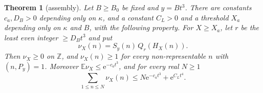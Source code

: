 \documentclass[10pt,reqno]{amsart}
\newtheorem{theorem}{Theorem}[section]
\theoremstyle{remark}
\newcommand{\E}{\mathbb E}
\newcommand{\e}{\mathrm e}
\begin{document}
\begin{theorem}[assembly]\label{thm:assembly}
Let $B\geq B_0$ be fixed and $y=Bt^3$.  There are constants $c_a,D_B>0$
depending only on $\kappa$, and a constant $C_L>0$ and a threshold $X_a$
depending only on $\kappa$ and $B$, with the following property.
For $X\geq X_a$, let $r$ be the least even integer $\geq D_Bt^3$ and put
\begin{equation}\label{eq:majorant}
 \nu_X(n)=S_y(n)\,Q_r(H_X(n)).
\end{equation}
Then $\nu_X\geq0$ on $\mathbb Z$, and $\nu_X(n)\geq1$ for every
non-representable $n$ with $(n,P_y)=1$.  Moreover $\E\nu_X\leq\e^{-c_at^3}$,
and for every real $N\geq1$
\begin{equation}\label{eq:integermean}
 \sum_{1\leq n\leq N}\nu_X(n)\leq N\e^{-c_at^3}+\e^{C_Lt^4}.
\end{equation}
\end{theorem}
\end{document}

